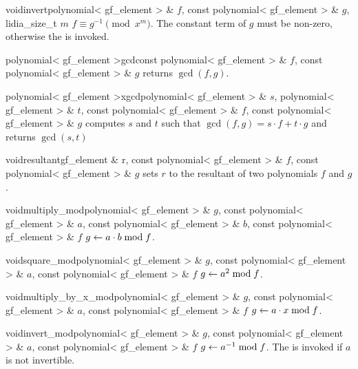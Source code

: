 \begin{fcode}{void}{invert}{polynomial< gf_element > & $f$, const polynomial< gf_element > & $g$,
    lidia_size_t $m$}%
  $f \equiv g^{-1} \pmod{x^m}$.  The constant term of $g$ must be non-zero, otherwise the \LEH
  is invoked.
\end{fcode}



\begin{fcode}{polynomial< gf_element >}{gcd}{const polynomial< gf_element > & $f$,
    const polynomial< gf_element > & $g$}%
  returns $\gcd(f, g)$.
\end{fcode}

\begin{fcode}{polynomial< gf_element >}{xgcd}{polynomial< gf_element > & $s$,
    polynomial< gf_element > & $t$, const polynomial< gf_element > & $f$, const polynomial< gf_element > & $g$}%
  computes $s$ and $t$ such that $\gcd(f, g) = s \cdot f + t \cdot g$ and returns $\gcd(s, t)$
\end{fcode}

\begin{fcode}{void}{resultant}{gf_element & r, const polynomial< gf_element > & $f$, const polynomial< gf_element > & $g$}
  sets $r$ to the resultant of two polynomials $f$ and $g$.
\end{fcode}



\begin{fcode}{void}{multiply_mod}{polynomial< gf_element > & $g$,
    const polynomial< gf_element > & $a$, const polynomial< gf_element > & $b$,
    const polynomial< gf_element > & $f$}%
  $g \leftarrow a \cdot b \bmod f$.
\end{fcode}

\begin{fcode}{void}{square_mod}{polynomial< gf_element > & $g$,
    const polynomial< gf_element > & $a$, const polynomial< gf_element > & $f$}%
  $g \leftarrow a^2 \bmod f$.
\end{fcode}

\begin{fcode}{void}{multiply_by_x_mod}{polynomial< gf_element > & $g$,
    const polynomial< gf_element > & $a$, const polynomial< gf_element > & $f$}%
  $g \leftarrow a \cdot x \bmod f$.
\end{fcode}

\begin{fcode}{void}{invert_mod}{polynomial< gf_element > & $g$,
    const polynomial< gf_element > & $a$, const polynomial< gf_element > & $f$}%
  $g \leftarrow a^{-1} \bmod f$.  The \LEH is invoked if $a$ is not invertible.
\end{fcode}


